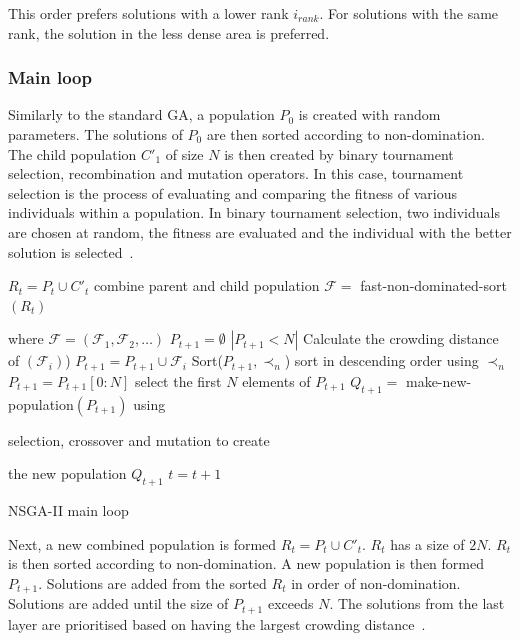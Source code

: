 \documentclass[sigconf]{acmart}
\begin{document}
This order prefers solutions with a lower rank $i_{rank}$. For solutions with the same rank, the solution in the less dense area is preferred.

\subsubsection{Main loop}

Similarly to the standard GA, a population $P_{0}$ is created with random parameters. The solutions of $P_0$ are then sorted according to non-domination. The child population $C'_{1}$ of size $N$ is then created by binary tournament selection, recombination and mutation operators. In this case, tournament selection is the process of evaluating and comparing the fitness of various individuals within a population. In binary tournament selection, two individuals are chosen at random, the fitness are evaluated and the individual with the better solution is selected~\cite{AbdRahman2016}. 



\begin{algorithm}[b]
\begin{algorithmic}[1]
\State $R_t=P_t \cup C'_t$ combine parent and child population
\State $\mathcal{F} = $ fast-non-dominated-sort $(R_t)$ 

where $\mathcal{F}=(\mathcal{F}_1, \mathcal{F}_2,\ldots)$
\State $P_{t+1}=\emptyset$
\While $\left|P_{t+1}<N\right|$
\State Calculate the crowding distance of $(\mathcal{F}_i)$)
\State $P_{t+1}=P_{t+1}\cup \mathcal{F}_i$
\EndWhile
\State Sort($P_{t+1}, \prec_n$) sort in descending order using $\prec_n$
\State $P_{t+1} = P_{t+1}[0:N]$ select the first $N$ elements of $P_{t+1}$
\State $Q_{t+1} = $ make-new-population$(P_{t+1})$ using 

selection, crossover and mutation to create 

the new population $Q_{t+1}$
\State $t=t+1$
\caption{NSGA-II main loop \cite{Valkanas2014}}
\label{algo:nsga2}
\end{algorithmic}
\end{algorithm}


Next, a new combined population is formed $R_{t}=P_{t} \cup C'_{t}$. $R_t$ has a size of $2N$. $R_t$ is then sorted according to non-domination. A new population is then formed $P_{t+1}$. Solutions are added from the sorted $R_t$ in order of non-domination. Solutions are added until the size of $P_{t+1}$ exceeds $N$. The solutions from the last layer are prioritised based on having the largest crowding distance~\cite{Valkanas2014}.
\end{document}
